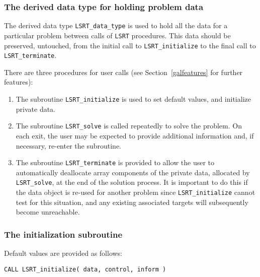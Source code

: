 \documentclass{galahad}
\newcommand{\packagename}{LS\-RT}
\begin{document}

\subsubsection{The derived data type for holding problem data}\label{typedata}
The derived data type 
{\tt \packagename\_data\_type} 
is used to hold all the data for a particular problem between calls of 
{\tt \packagename} procedures. 
This data should be preserved, untouched, from the initial call to 
{\tt \packagename\_initialize}
to the final call to
{\tt \packagename\_terminate}.


\galarguments
There are three procedures for user calls
(see Section~\ref{galfeatures} for further features): 

\begin{enumerate}
\item The subroutine 
      {\tt \packagename\_initialize} 
      is used to set default values, and initialize private data.
\item The subroutine 
      {\tt \packagename\_solve} 
      is called repeatedly to solve the problem. 
      On each exit, the user may be expected to provide additional 
      information and, if necessary, re-enter the subroutine. 
\item The subroutine 
      {\tt \packagename\_terminate} 
      is provided to allow the user to automatically deallocate array 
       components of the private data, allocated by 
       {\tt \packagename\_solve}, 
       at the end of the solution process. 
       It is important to do this if the data object is re-used for another  
       problem since {\tt \packagename\_initialize} cannot test for this 
       situation,  
       and any existing associated targets will subsequently become 
       unreachable. 
\end{enumerate}


\subsubsection{The initialization subroutine}\label{subinit}
 Default values are provided as follows:

\hskip0.5in 
{\tt CALL \packagename\_initialize( data, control, inform )}
\end{document}
